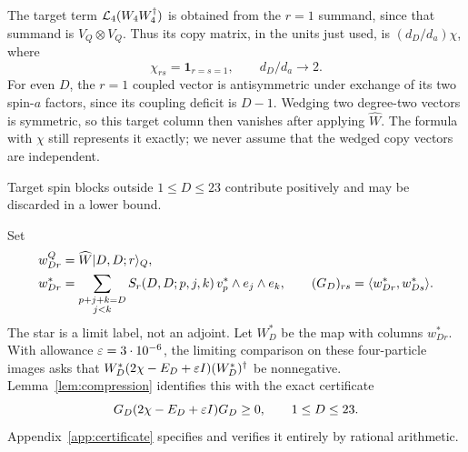 The target term $\mathcal L_4(W_4W_4^\dagger)$ is obtained from the $r=1$ summand, since that summand is $V_Q\otimes V_Q$. Thus its copy matrix, in the units just used, is $(d_D/d_a)\chi$, where
\[
 \chi_{rs}=\mathbf1_{r=s=1},\qquad d_D/d_a\longrightarrow2.
\]
For even $D$, the $r=1$ coupled vector is antisymmetric under exchange
of its two spin-$a$ factors, since its coupling deficit is $D-1$.
Wedging two degree-two vectors is symmetric, so this target column then
vanishes after applying $\widehat W$. The formula with $\chi$ still
represents it exactly; we never assume that the wedged copy vectors are
independent.

Target spin blocks outside $1\le D\le23$ contribute positively and may be discarded in a lower bound.

Set
\begin{align}
 w_{Dr}^Q&=\widehat W\lvert D,D;r\rangle_Q,\label{eq:wQ}\\
 w_{Dr}^*&=\sum_{\substack{p+j+k=D\\j<k}}
 S_r(D,D;p,j,k)\,v_p^*\wedge e_j\wedge e_k,\qquad
 (G_D)_{rs}=\langle w_{Dr}^*,w_{Ds}^*\rangle.\label{eq:wstar}
\end{align}
The star is a limit label, not an adjoint. Let $W_D^*$ be the map with columns
$w_{Dr}^*$. With allowance $\varepsilon=3\cdot10^{-6}$, the limiting comparison on
these four-particle images asks that
$W_D^*(2\chi-E_D+\varepsilon I)(W_D^*)^\dagger$ be nonnegative.
Lemma~\ref{lem:compression} identifies this with the exact certificate
\begin{equation}\label{eq:4certificate}
 G_D(2\chi-E_D+\varepsilon I)G_D\ge0,
 \qquad 1\le D\le23.
\end{equation}
Appendix~\ref{app:certificate} specifies and verifies it entirely by rational arithmetic.
